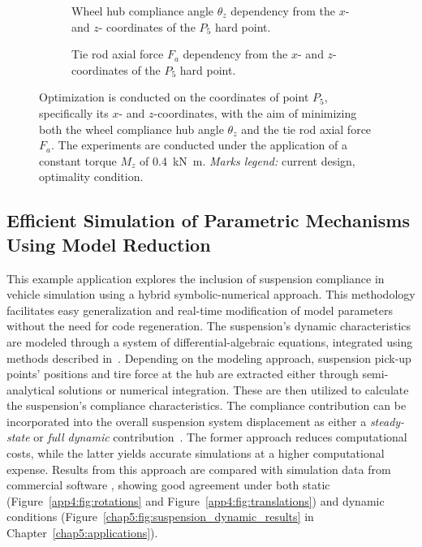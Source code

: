\begin{figure}[htb]
  \centering
    \begin{subfigure}[t]{0.49\textwidth}
    \small{}
    \caption{Wheel hub compliance angle $\theta_z$ dependency from the $x$- and $z$- coordinates of the $P_5$ hard point.}
    \label{app4:fig:variation_theta_z}
  \end{subfigure}
  \hfill
  \begin{subfigure}[t]{0.49\textwidth}
    \centering
    \small{}
    \caption{Tie rod axial force $F_a$ dependency from the $x$- and $z$- coordinates of the $P_5$ hard point.}
    \label{app4:fig:variation_force_tie}
  \end{subfigure}
  \caption{Optimization is conducted on the coordinates of point $P_5$, specifically its $x$- and $z$-coordinates, with the aim of minimizing both the wheel compliance hub angle $\theta_z$ and the tie rod axial force $F_a$. The experiments are conducted under the application of a constant torque $M_z$ of \SI{0.4}{\kilo\newton\meter}. \emph{Marks legend:} {\color{mycolor2}\raisebox{-.15pt}{\Large$\bullet$}} current design, {\color{mycolor5}\raisebox{-.15pt}{\Large$\bullet$}} optimality condition.}
  \label{app4:fig:optimization}
\end{figure}

\subsection{Efficient Simulation of Parametric Mechanisms Using Model Reduction}

This example application explores the inclusion of suspension compliance in vehicle simulation using a hybrid symbolic-numerical approach. This methodology facilitates easy generalization and real-time modification of model parameters without the need for code regeneration. The suspension's dynamic characteristics are modeled through a system of differential-algebraic equations, integrated using methods described in~\cite{larcher2024imece_symbolic}. Depending on the modeling approach, suspension pick-up points' positions and tire force at the hub are extracted either through semi-analytical solutions or numerical integration. These are then utilized to calculate the suspension's compliance characteristics. The compliance contribution can be incorporated into the overall suspension system displacement as either a \emph{steady-state} or \emph{full dynamic} contribution~\cite{larcher2024imece_symbolic}. The former approach reduces computational costs, while the latter yields accurate simulations at a higher computational expense. Results from this approach are compared with simulation data from commercial software \Ansys{}, showing good agreement under both static (Figure~\ref{app4:fig:rotations} and Figure~\ref{app4:fig:translations}) and dynamic conditions (Figure~\ref{chap5:fig:suspension_dynamic_results} in Chapter~\ref{chap5:applications}).

